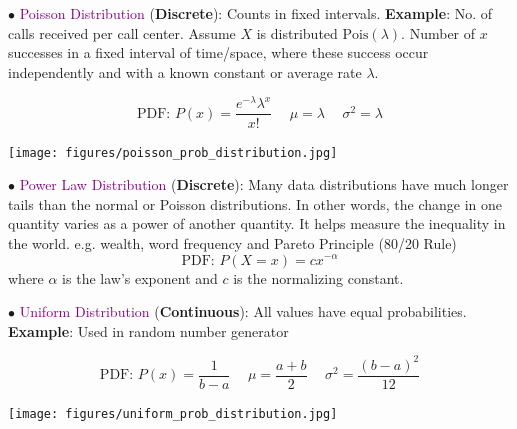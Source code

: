 \documentclass[letterpaper, 10.5pt,landscape]{article}
\begin{document}
\begin{multicols*}{3}
$\bullet$ \textcolor{purple}{Poisson Distribution} (\textbf{Discrete}):  Counts in fixed intervals. \textbf{Example}: No. of calls received per call center. Assume $X$ is distributed \(\text{Pois}(\lambda) \). Number of $x$ successes in a fixed interval of time/space, where these success occur independently and with a known constant or average rate $\lambda$.

\vspace{-3pt}
\[\boxed{\text{PDF: } P(x) = \frac{e^{-\lambda} \lambda^{x}}{x!}} \hspace{15pt}  \boxed{\mu =   \lambda} \hspace{15pt} \boxed{\sigma^{2} = \lambda }  \]

\vspace{-4pt}
\begin{center}
    \begin{minipage}{0.5\linewidth}
    \texttt{[image: figures/poisson\_prob\_distribution.jpg]}
    \end{minipage}
\end{center}
\vspace{-4pt}

$\bullet$ \textcolor{purple}{Power Law Distribution} (\textbf{Discrete}):
Many data distributions have much longer tails than
the normal or Poisson distributions. In other words,
the change in one quantity varies as a power of another
quantity. It helps measure the inequality in the world.
e.g. wealth, word frequency and Pareto Principle (80/20
Rule)
\vspace{-3pt}
\[\boxed{\text{PDF: } P(X=x) = cx^{-\alpha}}\]
where $\alpha$ is the law's exponent and $c$ is the normalizing constant.


\vspace{3pt}
$\bullet$ \textcolor{purple}{Uniform Distribution} (\textbf{Continuous}):
All values have equal probabilities. \textbf{Example}:  Used in random number generator

\[\boxed{\text{PDF: } P(x) = \frac{1}{b-a}} \hspace{15pt} \boxed{\mu =\frac{a+b}{2}}  \hspace{15pt}  \boxed{\sigma^{2} = \frac{(b-a)^{2}}{12} } \]


\vspace{-4pt}
\begin{center}
    \begin{minipage}{0.5\linewidth}
    \texttt{[image: figures/uniform\_prob\_distribution.jpg]}
    \end{minipage}
\end{center}
\vspace{-4pt}



\end{multicols*}
\end{document}
